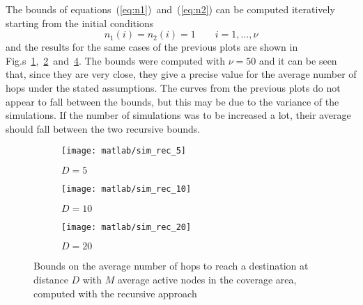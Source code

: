 \documentclass[a4paper,oneside]{article}
\begin{document}
  The bounds of equations~(\ref{eq:n1})~and~(\ref{eq:n2}) can be
  computed iteratively starting from the initial conditions
  \begin{equation}
    n_1(i) = n_2(i) = 1 \qquad i = 1, \dots, \nu 
  \end{equation}
  and the results for the same cases of the previous plots are shown
  in
  Fig.s~\ref{plot:geraf_rec_5},~\ref{plot:geraf_rec_10}~and~\ref{plot:geraf_rec_20}. The
  bounds were computed with $\nu = 50$ and it can be seen that, since
  they are very close, they give a precise value for the average
  number of hops under the stated assumptions.
  The curves from the previous plots do not appear to fall between
  the bounds, but this may be due to the variance of the
  simulations. If the number of simulations was to be increased a lot,
  their average should fall between the two recursive bounds.
\begin{figure}[htbp]
  \centering
  \begin{subfigure}{0.5\textwidth}
    \centering
    \texttt{[image: matlab/sim\_rec\_5]}
    \caption{$ D = 5 $}
    \label{plot:geraf_rec_5}
  \end{subfigure}%
  \begin{subfigure}{0.5\textwidth}
    \centering
    \texttt{[image: matlab/sim\_rec\_10]}
    \caption{$ D = 10 $}
    \label{plot:geraf_rec_10}
  \end{subfigure}
  \begin{subfigure}{0.5\textwidth}
    \centering
    \texttt{[image: matlab/sim\_rec\_20]}
    \caption{$ D = 20 $}
    \label{plot:geraf_rec_20}
  \end{subfigure}
  \caption{Bounds on the average number of hops to reach a destination
    at distance $D$ with $M$ average active nodes in the coverage
    area, computed with the recursive approach}
\end{figure}
\end{document}
